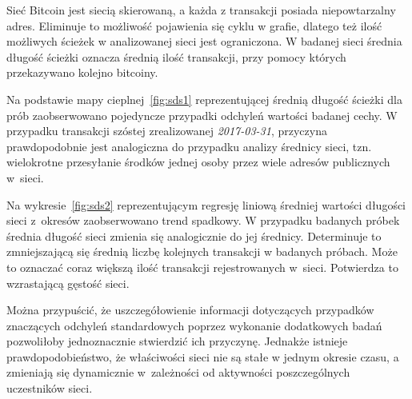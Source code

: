 \documentclass[12pt, twoside, final, openany]{mgr}
\begin{document}
\indent Sieć Bitcoin jest siecią skierowaną, a każda z transakcji posiada niepowtarzalny adres. Eliminuje to możliwość pojawienia się cyklu w grafie, dlatego też ilość możliwych ścieżek w analizowanej sieci jest ograniczona. W badanej sieci średnia długość ścieżki oznacza średnią ilość transakcji, przy pomocy których przekazywano kolejno bitcoiny.

\indent Na podstawie mapy cieplnej~\ref{fig:sds1} reprezentującej średnią długość ścieżki dla prób zaobserwowano pojedyncze przypadki odchyleń wartości badanej cechy. W przypadku transakcji szóstej zrealizowanej \textit{2017-03-31}, przyczyna prawdopodobnie jest analogiczna do przypadku analizy średnicy sieci, tzn. wielokrotne przesyłanie środków jednej osoby przez wiele adresów publicznych w~sieci.

\indent Na wykresie~\ref{fig:sds2} reprezentującym regresję liniową średniej wartości długości sieci z~okresów zaobserwowano trend spadkowy. W przypadku badanych próbek średnia długość sieci zmienia się analogicznie do jej średnicy. Determinuje to zmniejszającą się średnią liczbę kolejnych transakcji w badanych próbach. Może to oznaczać coraz większą ilość transakcji rejestrowanych w~sieci. Potwierdza to wzrastającą gęstość sieci.

\indent Można przypuścić, że uszczegółowienie informacji dotyczących przypadków znaczących odchyleń standardowych poprzez wykonanie dodatkowych badań pozwoliłoby jednoznacznie stwierdzić ich przyczynę. Jednakże istnieje prawdopodobieństwo, że właściwości sieci nie są stałe w jednym okresie czasu, a zmieniają się dynamicznie w~zależności od aktywności poszczególnych uczestników sieci.
\end{document}
